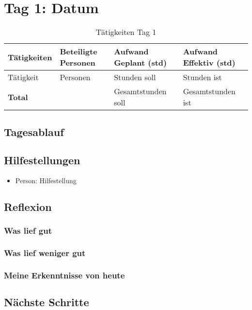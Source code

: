 \section{Tag 1: Datum}
\begin{table}[H]
    \begin{tabular}{|L{0.4\textwidth}|C{60pt}|C{60pt}|C{60pt}|}
        \hline
        \color{white}Tätigkeiten & \color{white}Beteiligte \color{white}Personen & \color{white}Aufwand Geplant (std) & \color{white}Aufwand Effektiv (std) \\
        \hline
         Tätigkeit & Personen & Stunden soll & Stunden ist \\
        \hline
        \textbf{Total} &  & Gesamtstunden soll & Gesamtstunden ist \\
        \hline
    \end{tabular}
    \caption{Tätigkeiten Tag 1}
\end{table}

\subsection*{Tagesablauf}

\subsection*{Hilfestellungen}
\begin{itemize}
    \item Person: Hilfestellung
\end{itemize}

\subsection*{Reflexion}

\subsubsection*{Was lief gut}

\subsubsection*{Was lief weniger gut}

\subsubsection*{Meine Erkenntnisse von heute}

\subsection*{Nächste Schritte}

\pagebreak
